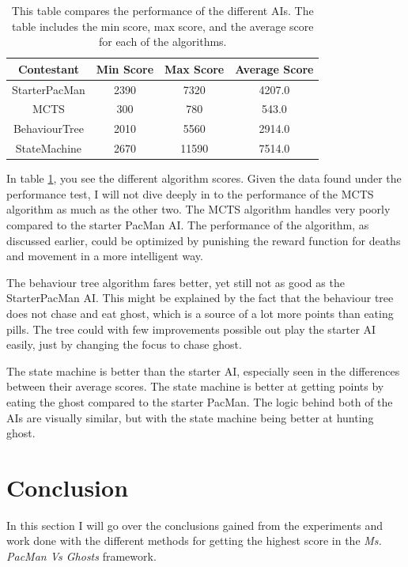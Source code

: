 \documentclass[conference,compsoc]{IEEEtran}
\begin{document}
\begin{table}[h]
\begin{center}
\begin{tabular}{|c|c|c|c|}
\hline
Contestant & Min Score & Max Score & Average Score\\
\hline
StarterPacMan & 2390 & 7320 & 4207.0 \\
\hline
MCTS & 300 & 780 & 543.0 \\
\hline
BehaviourTree & 2010 & 5560 & 2914.0 \\
\hline
StateMachine & 2670 & 11590 & 7514.0 \\
\hline
\end{tabular}
\end{center}
\caption{This table compares the performance of the different AIs. The table includes the min score, max score, and the average score for each of the algorithms.}
\label{tab:Exper}
\end{table}
In table \ref{tab:Exper}, you see the different algorithm scores. 
Given the data found under the performance test, I will not dive deeply in to the performance of the MCTS algorithm as much as the other two.
The MCTS algorithm handles very poorly compared to the starter PacMan AI. The performance of the algorithm, as discussed earlier, could be optimized by punishing the reward function for deaths and movement in a more intelligent way.

The behaviour tree algorithm fares better, yet still not as good as the StarterPacMan AI. This might be explained by the fact that the behaviour tree does not chase and eat ghost, which is a source of a lot more points than eating pills. The tree could with few improvements possible out play the starter AI easily, just by changing the focus to chase ghost.

The state machine is better than the starter AI, especially seen in the differences between their average scores. The state machine is better at getting points by eating the ghost compared to the starter PacMan. The logic behind both of the AIs are visually similar, but with the state machine being better at hunting ghost. 

\section{Conclusion}
In this section I will go over the conclusions gained from the experiments and work done with the different methods for getting the highest score in the \textit{Ms. PacMan Vs Ghosts} framework.
\end{document}
